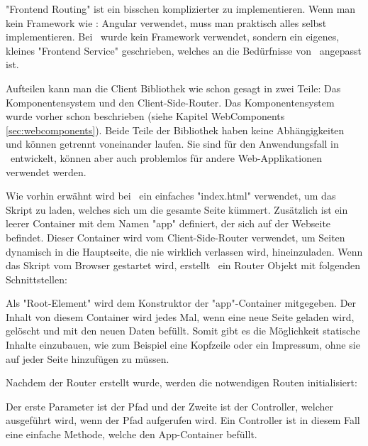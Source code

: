 \label{sec:csrouterimp}

"Frontend Routing" ist ein bisschen komplizierter zu implementieren. Wenn man kein Framework wie \zb: Angular verwendet, muss man praktisch alles selbst implementieren. Bei \ZELIA\ wurde kein Framework verwendet, sondern  ein eigenes, kleines "Frontend Service" geschrieben, welches an die Bedürfnisse von \ZELIA\ angepasst ist.

Aufteilen kann man die Client Bibliothek wie schon gesagt in zwei Teile: Das Komponentensystem und den Client-Side-Router. Das Komponentensystem wurde vorher schon beschrieben (siehe Kapitel WebComponents \ref{sec:webcomponents}). Beide Teile der Bibliothek haben keine Abhängigkeiten und können getrennt voneinander laufen. Sie sind für den Anwendungsfall in \ZELIA\ entwickelt, können aber auch problemlos für andere Web-Applikationen verwendet werden.

Wie vorhin erwähnt wird bei \ZELIA\ ein einfaches "index.html" verwendet, um das Skript zu laden, welches sich um die gesamte Seite kümmert. Zusätzlich ist ein leerer Container mit dem Namen "app" definiert, der sich auf der Webseite befindet. Dieser Container wird vom Client-Side-Router verwendet, um Seiten dynamisch in die Hauptseite, die nie wirklich verlassen wird, hineinzuladen. Wenn das Skript vom Browser gestartet wird, erstellt \ZELIA\ ein Router Objekt mit folgenden Schnittstellen:


Als "Root-Element" wird dem Konstruktor der "app"-Container mitgegeben. Der Inhalt von diesem Container wird jedes Mal, wenn eine neue Seite geladen wird, gelöscht und mit den neuen Daten befüllt. Somit gibt es die Möglichkeit statische Inhalte einzubauen, wie zum Beispiel eine Kopfzeile oder ein Impressum, ohne sie auf jeder Seite hinzufügen zu müssen.

Nachdem der Router erstellt wurde, werden die notwendigen Routen initialisiert:



Der erste Parameter ist der Pfad und der Zweite ist der Controller, welcher ausgeführt wird, wenn der Pfad aufgerufen wird. Ein Controller ist in diesem Fall eine einfache Methode, welche den App-Container befüllt.


